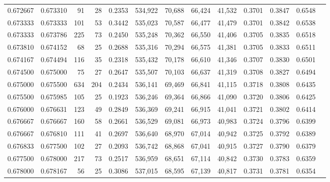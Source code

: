\begin{tabular}{rrrrrrrrrrrrr}
0.672667 & 0.673310 &    91 &  28 &                                     0.2353 & 534,922 &  70,688 &  66,424 &  41,532 & 0.3701 & 0.3847 & 0.6548 \\
0.673333 & 0.673333 &   101 &  53 &                                     0.3442 & 535,023 &  70,587 &  66,477 &  41,479 & 0.3701 & 0.3842 & 0.6538 \\
0.673333 & 0.673786 &   225 &  73 &                                     0.2450 & 535,248 &  70,362 &  66,550 &  41,406 & 0.3705 & 0.3835 & 0.6518 \\
0.673810 & 0.674152 &    68 &  25 &                                     0.2688 & 535,316 &  70,294 &  66,575 &  41,381 & 0.3705 & 0.3833 & 0.6511 \\
0.674167 & 0.674494 &   116 &  35 &                                     0.2318 & 535,432 &  70,178 &  66,610 &  41,346 & 0.3707 & 0.3830 & 0.6501 \\
0.674500 & 0.675000 &    75 &  27 &                                     0.2647 & 535,507 &  70,103 &  66,637 &  41,319 & 0.3708 & 0.3827 & 0.6494 \\
0.675000 & 0.675500 &   634 & 204 &                                     0.2434 & 536,141 &  69,469 &  66,841 &  41,115 & 0.3718 & 0.3808 & 0.6435 \\
0.675500 & 0.675985 &   105 &  25 &                                     0.1923 & 536,246 &  69,364 &  66,866 &  41,090 & 0.3720 & 0.3806 & 0.6425 \\
0.676000 & 0.676631 &   123 &  49 &                                     0.2849 & 536,369 &  69,241 &  66,915 &  41,041 & 0.3721 & 0.3802 & 0.6414 \\
0.676667 & 0.676667 &   160 &  58 &                                     0.2661 & 536,529 &  69,081 &  66,973 &  40,983 & 0.3724 & 0.3796 & 0.6399 \\
0.676667 & 0.676810 &   111 &  41 &                                     0.2697 & 536,640 &  68,970 &  67,014 &  40,942 & 0.3725 & 0.3792 & 0.6389 \\
0.676833 & 0.677500 &   102 &  27 &                                     0.2093 & 536,742 &  68,868 &  67,041 &  40,915 & 0.3727 & 0.3790 & 0.6379 \\
0.677500 & 0.678000 &   217 &  73 &                                     0.2517 & 536,959 &  68,651 &  67,114 &  40,842 & 0.3730 & 0.3783 & 0.6359 \\
0.678000 & 0.678167 &    56 &  25 &                                     0.3086 & 537,015 &  68,595 &  67,139 &  40,817 & 0.3731 & 0.3781 & 0.6354 \\

\end{tabular}
